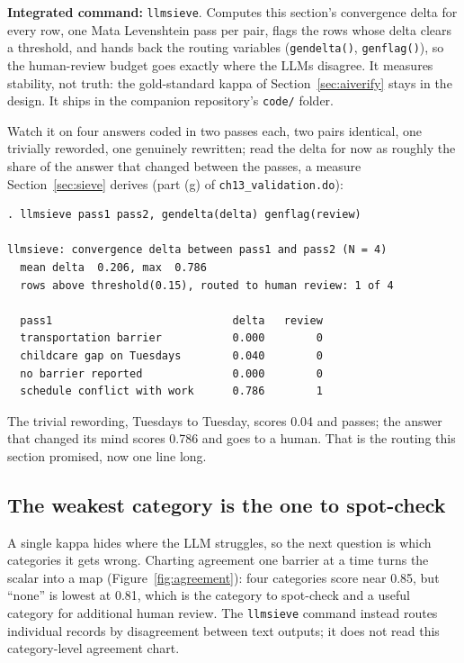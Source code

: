 \begin{kaobox}[frametitle=Package Integration: \texttt{llmsieve}]
\textbf{Integrated command:} \texttt{llmsieve}. Computes this section's convergence delta for every row, one Mata Levenshtein pass per pair, flags the rows whose delta clears a threshold, and hands back the routing variables (\texttt{gendelta()}, \texttt{genflag()}), so the human-review budget goes exactly where the LLMs disagree. It measures stability, not truth: the gold-standard kappa of Section~\ref{sec:aiverify} stays in the design. It ships in the companion repository's \texttt{code/} folder.
\end{kaobox}

Watch it on four answers coded in two passes each, two pairs identical, one trivially reworded, one genuinely rewritten; read the delta for now as roughly the share of the answer that changed between the passes, a measure Section~\ref{sec:sieve} derives (part (g) of \texttt{ch13\_validation.do}):
\par
{\footnotesize
\begin{verbatim}
. llmsieve pass1 pass2, gendelta(delta) genflag(review)

llmsieve: convergence delta between pass1 and pass2 (N = 4)
  mean delta  0.206, max  0.786
  rows above threshold(0.15), routed to human review: 1 of 4

  pass1                            delta   review
  transportation barrier           0.000        0
  childcare gap on Tuesdays        0.040        0
  no barrier reported              0.000        0
  schedule conflict with work      0.786        1
\end{verbatim}
}
The trivial rewording, Tuesdays to Tuesday, scores 0.04 and passes; the answer that changed its mind scores 0.786 and goes to a human. That is the routing this section promised, now one line long.

\subsection{The weakest category is the one to spot-check}\label{sec:kappa-by-category}
A single kappa hides where the LLM struggles, so the next question is which categories it gets wrong. Charting agreement one barrier at a time turns the scalar into a map (Figure~\ref{fig:agreement}): four categories score near 0.85, but \enquote{none} is lowest at 0.81, which is the category to spot-check and a useful category for additional human review. The \texttt{llmsieve} command instead routes individual records by disagreement between text outputs; it does not read this category-level agreement chart.

